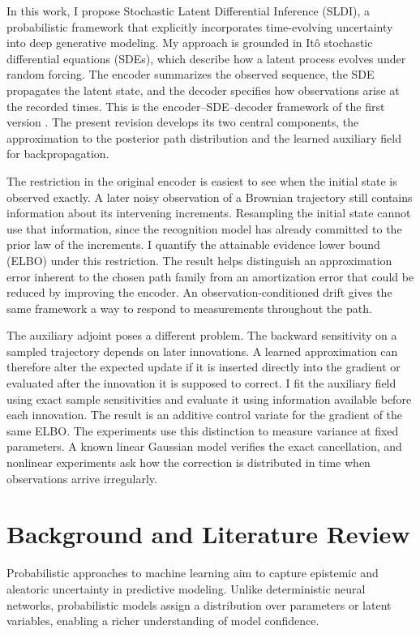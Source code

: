 \documentclass[12pt]{article}
\begin{document}
In this work, I propose Stochastic Latent Differential Inference (SLDI), a probabilistic framework that explicitly incorporates time-evolving uncertainty into deep generative modeling. My approach is grounded in It\^o stochastic differential equations (SDEs), which describe how a latent process evolves under random forcing. The encoder summarizes the observed sequence, the SDE propagates the latent state, and the decoder specifies how observations arise at the recorded times. This is the encoder--SDE--decoder framework of the first version \citep{rice2026sldi}. The present revision develops its two central components, the approximation to the posterior path distribution and the learned auxiliary field for backpropagation.

The restriction in the original encoder is easiest to see when the initial state is observed exactly. A later noisy observation of a Brownian trajectory still contains information about its intervening increments. Resampling the initial state cannot use that information, since the recognition model has already committed to the prior law of the increments. I quantify the attainable evidence lower bound (ELBO) under this restriction. The result helps distinguish an approximation error inherent to the chosen path family from an amortization error that could be reduced by improving the encoder. An observation-conditioned drift gives the same framework a way to respond to measurements throughout the path.

The auxiliary adjoint poses a different problem. The backward sensitivity on a sampled trajectory depends on later innovations. A learned approximation can therefore alter the expected update if it is inserted directly into the gradient or evaluated after the innovation it is supposed to correct. I fit the auxiliary field using exact sample sensitivities and evaluate it using information available before each innovation. The result is an additive control variate for the gradient of the same ELBO. The experiments use this distinction to measure variance at fixed parameters. A known linear Gaussian model verifies the exact cancellation, and nonlinear experiments ask how the correction is distributed in time when observations arrive irregularly.

\section*{Background and Literature Review}

Probabilistic approaches to machine learning aim to capture epistemic and aleatoric uncertainty in predictive modeling. Unlike deterministic neural networks, probabilistic models assign a distribution over parameters or latent variables, enabling a richer understanding of model confidence.
\end{document}
